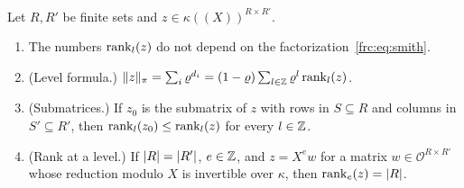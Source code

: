 \begin{lemma}\label{frc:lem:trace-norm}
Let $R,R'$ be finite sets and $z\in\kappa((X))^{R\times R'}$.
\begin{enumerate}
\item The numbers $\operatorname{rank}_l(z)$ do not depend on the factorization~\eqref{frc:eq:smith}.
\item \textup{(Level formula.)} $\lVert z\rVert_\pi=\sum_i\varrho^{d_i}=(1-\varrho)\sum_{l\in\mathbb Z}\varrho^l\operatorname{rank}_l(z)$.
\item \textup{(Submatrices.)} If $z_0$ is the submatrix of $z$ with rows in $S\subseteq R$ and columns in
$S'\subseteq R'$, then $\operatorname{rank}_l(z_0)\le\operatorname{rank}_l(z)$ for every $l\in\mathbb Z$.
\item \textup{(Rank at a level.)} If $\lvert R\rvert=\lvert R'\rvert$, $e\in\mathbb Z$, and $z=X^ew$ for a matrix $w\in\mathcal O^{R\times R'}$
whose reduction modulo $X$ is invertible over $\kappa$, then $\operatorname{rank}_e(z)=\lvert R\rvert$.
\end{enumerate}
\end{lemma}

